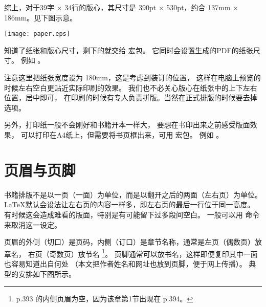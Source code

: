 综上，对于39字 $\times$ 34行的版心，其尺寸是 390pt $\times$ 530pt，约合 137mm $\times$ 186mm。见下图示意。

\centerline{\texttt{[image: paper.eps]}}

知道了纸张和版心尺寸，剩下的就交给  宏包。
它同时会设置生成的PDF的纸张尺寸。
例如 。


注意这里把纸张宽度设为 180mm，这是考虑到装订的位置，
这样在电脑上预览的时候左右空白更贴近实际印刷的效果。
我们也不必关心版心在纸张中的上下左右位置，居中即可，
在印刷的时候有专人负责拼版。当然在正式排版的时候要去掉  选项。

另外，打印纸一般不会刚好和书籍开本一样大，
要想在书印出来之前感受版面效果，
可以打印在A4纸上，但需要将书页框出来，可用  宏包。
例如 。


\section{页眉与页脚} %

书籍排版不是以一页（一面）为单位，而是以翻开之后的两面（左右页）为单位。
\LaTeX 默认会设法让左右页的内容一样多，即左右页的最后一行位于同一高度。
有时候这会造成难看的版面，特别是有可能留下过多段间空白。
一般可以用  命令来取消这一设定。

页眉的外侧（切口）是页码，内侧（订口）是章节名称，通常是左页（偶数页）放章名，
右页（奇数页）放节名
\footnote{\mybooktitle p.393 的内侧页眉为空，因为该章第1节出现在 p.394。}。
页脚通常可以放书名，这样即便复印其中一面也容易知道出自何处%
（本文把作者姓名和网址也放到页脚，便于网上传播）。
典型的安排如下图所示。

